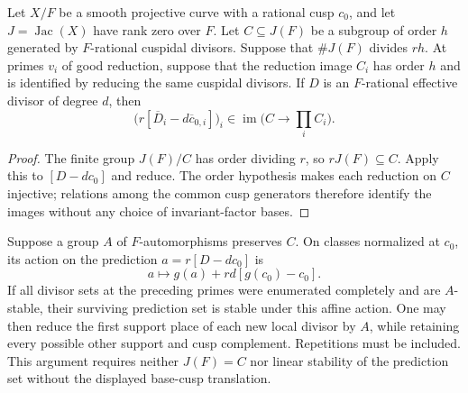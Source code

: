 \begin{lemma}\label{lem:octic-multiple-cusp-diagonal}
Let $X/F$ be a smooth projective curve with a rational cusp $c_0$,
and let $J=\operatorname{Jac}(X)$ have rank zero over $F$.
Let $C\subseteq J(F)$ be a subgroup of order $h$ generated by
$F$-rational cuspidal divisors. Suppose that $\#J(F)$ divides
$rh$. At primes $v_i$ of good reduction, suppose that the
reduction image $C_i$ has order $h$ and is identified by reducing
the same cuspidal divisors. If $D$ is an $F$-rational effective
divisor of degree $d$, then
\[
 \bigl(r[\overline D_i-d\overline c_{0,i}]\bigr)_i
 \in\operatorname{im}\bigl(C\longrightarrow\prod_i C_i\bigr).
\]
\end{lemma}
\begin{proof}
The finite group $J(F)/C$ has order dividing $r$, so
$rJ(F)\subseteq C$. Apply this to $[D-dc_0]$ and reduce.
The order hypothesis makes each reduction on $C$ injective;
relations among the common cusp generators therefore identify
the images without any choice of invariant-factor bases.
\end{proof}

\begin{remark}\label{rem:octic-diagonal-affine-action}
Suppose a group $A$ of $F$-automorphisms preserves $C$.
On classes normalized at $c_0$, its action on the prediction
$a=r[D-dc_0]$ is
\[
 a\longmapsto g(a)+rd[g(c_0)-c_0].
\]
If all divisor sets at the preceding primes were enumerated
completely and are $A$-stable, their surviving prediction set
is stable under this affine action. One may then reduce the
first support place of each new local divisor by $A$, while
retaining every possible other support and cusp complement.
Repetitions must be included. This argument requires neither
$J(F)=C$ nor linear stability of the prediction set without
the displayed base-cusp translation.
\end{remark}
